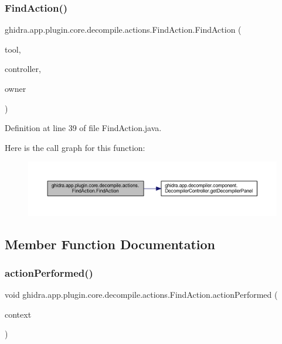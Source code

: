 \subsubsection{\texorpdfstring{FindAction()}{FindAction()}}
{\footnotesize\ttfamily ghidra.\+app.\+plugin.\+core.\+decompile.\+actions.\+Find\+Action.\+Find\+Action (\begin{DoxyParamCaption}\item[{Plugin\+Tool}]{tool,  }\item[{\mbox{\hyperlink{classghidra_1_1app_1_1decompiler_1_1component_1_1_decompiler_controller}{Decompiler\+Controller}}}]{controller,  }\item[{String}]{owner }\end{DoxyParamCaption})\hspace{0.3cm}{\ttfamily [inline]}}



Definition at line 39 of file Find\+Action.\+java.

Here is the call graph for this function\+:
\nopagebreak
\begin{figure}[H]
\begin{center}
\leavevmode
\includegraphics[width=350pt]{classghidra_1_1app_1_1plugin_1_1core_1_1decompile_1_1actions_1_1_find_action_a0d7e610b21288850e97a9c0a1f3eb6d1_cgraph}
\end{center}
\end{figure}


\subsection{Member Function Documentation}
\mbox{\label{classghidra_1_1app_1_1plugin_1_1core_1_1decompile_1_1actions_1_1_find_action_a047e89d039f5e9c44916d7d309cb9fea}} 
\subsubsection{\texorpdfstring{actionPerformed()}{actionPerformed()}}
{\footnotesize\ttfamily void ghidra.\+app.\+plugin.\+core.\+decompile.\+actions.\+Find\+Action.\+action\+Performed (\begin{DoxyParamCaption}\item[{Action\+Context}]{context }\end{DoxyParamCaption})\hspace{0.3cm}{\ttfamily [inline]}}



